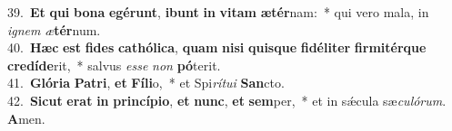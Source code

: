{39.~}\textbf{Et} \textbf{qui} \textbf{bo}\textbf{na} \textbf{e}\textbf{gé}\textbf{runt}, \textbf{i}\textbf{bunt} \textbf{in} \textbf{vi}\textbf{tam} \textbf{æ}\textbf{tér}nam:~* qui vero mala, in \textit{i}\textit{gnem} \textit{æ}\textbf{tér}num.\\
{40.~}\textbf{Hæc} \textbf{est} \textbf{fi}\textbf{des} \textbf{ca}\textbf{thó}\textbf{li}\textbf{ca}, \textbf{quam} \textbf{ni}\textbf{si} \textbf{quis}\textbf{que} \textbf{fi}\textbf{dé}\textbf{li}\textbf{ter} \textbf{fir}\textbf{mi}\textbf{tér}\textbf{que} \textbf{cre}\textbf{dí}\textbf{de}rit,~* salvus \textit{es}\textit{se} \textit{non} \textbf{pó}terit.\\
{41.~}\textbf{Gló}\textbf{ri}\textbf{a} \textbf{Pa}\textbf{tri}, \textbf{et} \textbf{Fí}\textbf{li}o,~* et Spi\textit{rí}\textit{tu}\textit{i} \textbf{San}cto.\\
{42.~}\textbf{Si}\textbf{cut} \textbf{e}\textbf{rat} \textbf{in} \textbf{prin}\textbf{cí}\textbf{pi}\textbf{o}, \textbf{et} \textbf{nunc}, \textbf{et} \textbf{sem}per,~* et in sǽcula sæ\textit{cu}\textit{ló}\textit{rum}. \textbf{A}men.\\
